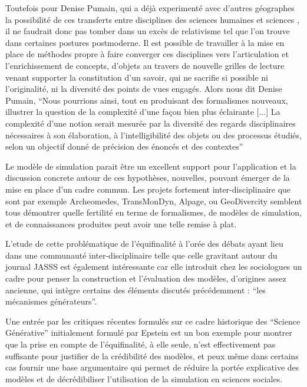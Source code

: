 Toutefois pour Denise Pumain, qui a déjà experimenté avec d'autres géographes la possibilité de ces transferts entre disciplines des sciences humaines et sciences  \autocites{Pumain1989,Sanders1992, Dastes1998}, il ne faudrait donc pas tomber dans un excès de relativisme tel que l'on trouve dans certaines postures postmoderne. Il est possible de travailler à la mise en place de méthodes  propre à faire converger ces disciplines vers l'articulation et l'enrichissement de concepts, d'objets au travers de nouvelle grilles de lecture venant supporter la constitution d'un savoir, qui ne sacrifie si possible ni l'originalité, ni la diversité des points de vues engagés. Alors nous dit Denise Pumain, \enquote{Nous pourrions ainsi, tout en produisant des formalismes nouveaux, illustrer la question de la complexité d’une façon bien plus éclairante [...] La complexité d’une notion serait mesurée par la diversité des regards disciplinaires nécessaires à son élaboration, à l’intelligibilité des objets ou des processus étudiés, selon un objectif donné de précision des énoncés et des contextes}

Le modèle de simulation parait être un excellent support pour l'application et la discussion concrete autour de ces hypothèses, nouvelles, pouvant émerger de la mise en place d'un cadre commun. Les projets fortement inter-disciplinaire que sont par exemple Archeomedes, TransMonDyn, Alpage, ou GeoDivercity \autocite{Chapron2014} semblent tous démontrer quelle fertilité en terme de formalismes, de modèles de simulation, et de connaissances produites peut avoir une telle remise à plat.

L'etude de cette problématique de l'équifinalité à l'orée des débats ayant lieu dans une communauté inter-disciplinaire telle que celle gravitant autour du journal JASSS est également intéressante car elle introduit chez les sociologues un cadre pour penser la construction et l'évaluation des modèles, d'origines assez ancienne, qui intègre certains des éléments discutés précédemment : \enquote{les mécanismes générateurs}.


Une entrée par les critiques récentes formulés sur ce cadre historique des \enquote{Science Générative} initialement formulé par Epstein est un bon exemple pour montrer que la prise en compte de l'équifinalité, à elle seule, n'est effectivement pas suffisante pour justifier de la crédibilité des modèles, et peux même dans certains cas fournir une base argumentaire qui permet de réduire la portée explicative des modèles et de décrédibiliser l'utilisation de la simulation en sciences sociales.

